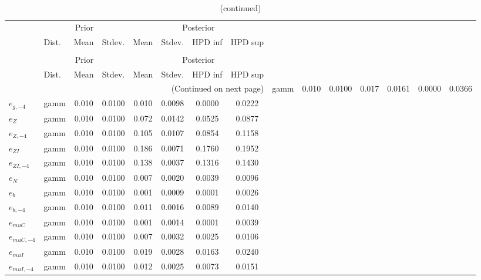  
\begin{center}
\begin{longtable}{llcccccc} 
\caption{Results from Metropolis-Hastings (standard deviation of structural shocks)}
 \label{Table:MHPosterior:2}\\
\toprule 
  & \multicolumn{3}{c}{Prior}  &  \multicolumn{4}{c}{Posterior} \\
  \cmidrule(r{.75em}){2-4} \cmidrule(r{.75em}){5-8}
  & Dist. & Mean  & Stdev. & Mean & Stdev. & HPD inf & HPD sup\\
\midrule \endfirsthead 
\caption{(continued)}\\\toprule 
  & \multicolumn{3}{c}{Prior}  &  \multicolumn{4}{c}{Posterior} \\
  \cmidrule(r{.75em}){2-4} \cmidrule(r{.75em}){5-8}
  & Dist. & Mean  & Stdev. & Mean & Stdev. & HPD inf & HPD sup\\
\midrule \endhead 
\bottomrule \multicolumn{8}{r}{(Continued on next page)} \endfoot 
\bottomrule \endlastfoot 
${e_g}$ & gamm &   0.010 & 0.0100 &   0.017& 0.0161 &  0.0000 &  0.0366 \\ 
${e_{g,-4}}$ & gamm &   0.010 & 0.0100 &   0.010& 0.0098 &  0.0000 &  0.0222 \\ 
${e_Z}$ & gamm &   0.010 & 0.0100 &   0.072& 0.0142 &  0.0525 &  0.0877 \\ 
${e_{Z,-4}}$ & gamm &   0.010 & 0.0100 &   0.105& 0.0107 &  0.0854 &  0.1158 \\ 
${e_{ZI}}$ & gamm &   0.010 & 0.0100 &   0.186& 0.0071 &  0.1760 &  0.1952 \\ 
${e_{ZI,-4}}$ & gamm &   0.010 & 0.0100 &   0.138& 0.0037 &  0.1316 &  0.1430 \\ 
${e_N}$ & gamm &   0.010 & 0.0100 &   0.007& 0.0020 &  0.0039 &  0.0096 \\ 
${e_b}$ & gamm &   0.010 & 0.0100 &   0.001& 0.0009 &  0.0001 &  0.0026 \\ 
${e_{b,-4}}$ & gamm &   0.010 & 0.0100 &   0.011& 0.0016 &  0.0089 &  0.0140 \\ 
${e_{muC}}$ & gamm &   0.010 & 0.0100 &   0.001& 0.0014 &  0.0001 &  0.0039 \\ 
${e_{muC,-4}}$ & gamm &   0.010 & 0.0100 &   0.007& 0.0032 &  0.0025 &  0.0106 \\ 
${e_{muI}}$ & gamm &   0.010 & 0.0100 &   0.019& 0.0028 &  0.0163 &  0.0240 \\ 
${e_{muI,-4}}$ & gamm &   0.010 & 0.0100 &   0.012& 0.0025 &  0.0073 &  0.0151 \\ 
\end{longtable}
 \end{center}
